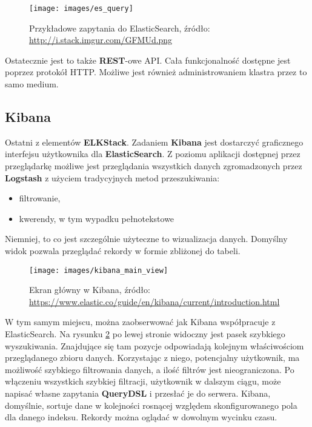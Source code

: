     \begin{figure}[H]
        \centering
        \texttt{[image: images/es\_query]}
        \caption[Przykładowe zapytania do ElasticSearch]{
            Przykładowe zapytania do ElasticSearch, źródło: \url{http://i.stack.imgur.com/GFMUd.png}
        }
        \label{chapter:application:elkstack:es:query}
    \end{figure}

    Ostatecznie jest to także \textbf{REST}-owe API. Cała funkcjonalność dostępne jest poprzez
    protokół HTTP. Możliwe jest również administrowaniem klastra przez to samo medium.
    
\subsection{Kibana}
\label{chapter:application:elkstack:kibana}

    Ostatni z elementów \textbf{ELKStack}. Zadaniem \textbf{Kibana} jest dostarczyć graficznego interfejsu
    użytkownika dla \textbf{ElasticSearch}. Z poziomu aplikacji dostępnej przez przeglądarkę możliwe
    jest przeglądania wszystkich danych zgromadzonych przez \textbf{Logstash} z użyciem tradycyjnych
    metod przeszukiwania:
    \begin{itemize}
        \item filtrowanie,
        \item kwerendy, w tym wypadku pełnotekstowe
    \end{itemize}
    
    Niemniej, to co jest szczególnie użyteczne to wizualizacja danych. Domyślny widok pozwala przeglądać 
    rekordy w formie zbliżonej do tabeli. 
    \begin{figure}[H]
        \centering
        \texttt{[image: images/kibana\_main\_view]}
        \caption[Ekran główny w Kibana]{
            Ekran główny w Kibana, źródło: \url{https://www.elastic.co/guide/en/kibana/current/introduction.html}
        }
        \label{chapter:application:elkstack:kibana:main_view}
    \end{figure}
    W tym samym miejscu, można zaobserwować jak Kibana współpracuje z ElasticSearch. Na rysunku \ref{chapter:application:elkstack:kibana:main_view} po lewej stronie widoczny jest pasek szybkiego
    wyszukiwania. Znajdujące się tam pozycje odpowiadają kolejnym właściwościom przeglądanego zbioru danych.
    Korzystając z niego, potencjalny użytkownik, ma możliwość szybkiego filtrowania danych, a ilość filtrów jest
    nieograniczona. Po włączeniu wszystkich szybkiej filtracji, użytkownik w dalszym ciągu, może napisać
    własne zapytania \textbf{QueryDSL} i przesłać je do serwera. Kibana, domyślnie, sortuje dane w kolejności
    rosnącej względem skonfigurowanego pola dla danego indeksu. Rekordy można oglądać w dowolnym wycinku czasu.
    
